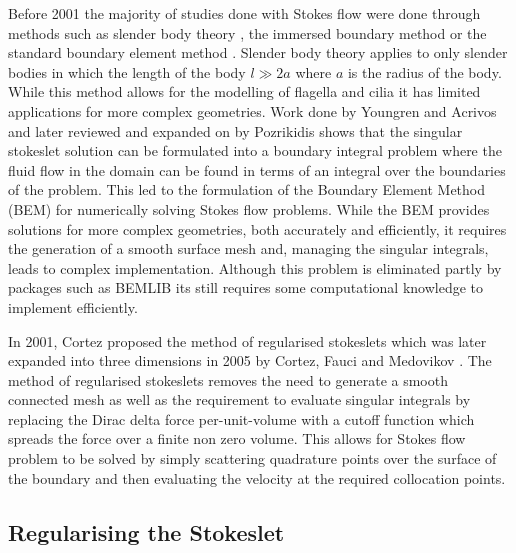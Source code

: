 Before 2001 the majority of studies done with Stokes flow were done through methods such as slender body theory \cite{Walker2020AFilaments,Johnson1980AnFlow}, the immersed boundary method  \cite{Fauci1993,Maxian2020,Fauci1995,Peskin2002} or the standard boundary element method \cite{Acrivos1975StokesSolution,Pozrikidis1992BoundaryFlow,Tran-Cong1987APropulsion}. Slender body theory applies to only slender bodies in which the length of the body $l \gg 2a$ where $a$ is the radius of the body. While this method allows for the modelling of flagella and cilia it has limited applications for more complex geometries. Work done by Youngren and Acrivos \cite{Acrivos1975StokesSolution} and later reviewed and expanded on by Pozrikidis \cite{Pozrikidis1992BoundaryFlow} shows that the singular stokeslet solution can be formulated into a boundary integral problem where the fluid flow in the domain can be found in terms of an integral over the boundaries of the problem. This led to the formulation of the Boundary Element Method (BEM) for numerically solving Stokes flow problems. While the BEM provides solutions for more complex geometries, both accurately and efficiently, it requires the generation of a smooth surface mesh and, managing the singular integrals, leads to complex implementation. Although this problem is eliminated partly by packages such as BEMLIB \cite{Pozrikidis2002ABEMLIB} its still requires some computational knowledge to implement efficiently.

In 2001, Cortez \cite{Cortez2001} proposed the method of regularised stokeslets which was later expanded into three dimensions in 2005 by Cortez, Fauci and Medovikov \cite{Cortez2005}. The method of regularised stokeslets removes the need to generate a smooth connected mesh as well as the requirement to evaluate singular integrals by replacing the Dirac delta force per-unit-volume with a cutoff function which spreads the force over a finite non zero volume. This allows for Stokes flow problem to be solved by simply scattering quadrature points over the surface of the boundary and then evaluating the velocity at the required collocation points.

\subsection{Regularising the Stokeslet}

